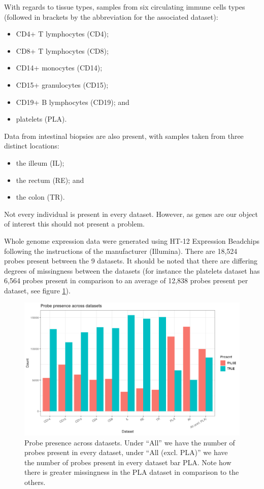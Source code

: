\documentclass[12pt]{article} %
\begin{document}
	With regards to tissue types, samples from six circulating immune cells types (followed in brackets by the abbreviation for the associated dataset):
	\begin{itemize}
		\item CD4+ T lymphocytes (CD4);
		\item CD8+ T lymphocytes (CD8);
		\item CD14+ monocytes (CD14);
		\item CD15+ granulocytes (CD15);
		\item CD19+ B lymphocytes (CD19); and 
		\item platelets (PLA).
	\end{itemize}
	Data from intestinal biopsies are also present, with samples taken from three distinct locations:
	\begin{itemize}
		\item the illeum (IL);
		\item the rectum (RE); and
		\item the colon (TR).
	\end{itemize} 
	Not every individual is present in every dataset. However, as genes are our object of interest this should not present a problem.
	
	Whole genome expression data were generated using HT-12 Expression Beadchips following the instructions of the manufacturer (Illumina). There are 18,524 probes present between the 9 datasets. It should be noted that there are differing degrees of missingness between the datasets (for instance the platelets dataset has 6,564 probes present in comparison to an average of 12,838 probes present per dataset, see figure \ref{fig:probe_presence_across_datasets}).
	
	\begin{figure}
		\centering
		\includegraphics[scale=0.9 ]{Images/Data_inspection/probe_presence_across_datasets.png}
		\caption{Probe presence across datasets. Under ``All'' we have the number of probes present in every dataset, under ``All (excl. PLA)'' we have the number of probes present in every dataset bar PLA. Note how there is greater missingness in the PLA dataset in comparison to the others.}
		\label{fig:probe_presence_across_datasets}
	\end{figure}
	
\end{document}
